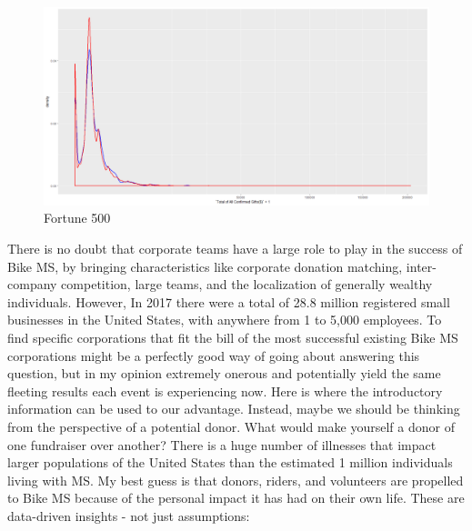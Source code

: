 \documentclass[]{article}
\begin{document}
\begin{figure}
\centering
\includegraphics{fortune500.png}
\caption{Fortune 500}
\end{figure}

There is no doubt that corporate teams have a large role to play in the
success of Bike MS, by bringing characteristics like corporate donation
matching, inter-company competition, large teams, and the localization
of generally wealthy individuals. However, In 2017 there were a total of
28.8 million registered small businesses in the United States, with
anywhere from 1 to 5,000 employees. To find specific corporations that
fit the bill of the most successful existing Bike MS corporations might
be a perfectly good way of going about answering this question, but in
my opinion extremely onerous and potentially yield the same fleeting
results each event is experiencing now. Here is where the introductory
information can be used to our advantage. Instead, maybe we should be
thinking from the perspective of a potential donor. What would make
yourself a donor of one fundraiser over another? There is a huge number
of illnesses that impact larger populations of the United States than
the estimated 1 million individuals living with MS. My best guess is
that donors, riders, and volunteers are propelled to Bike MS because of
the personal impact it has had on their own life. These are data-driven
insights - not just assumptions:
\end{document}
